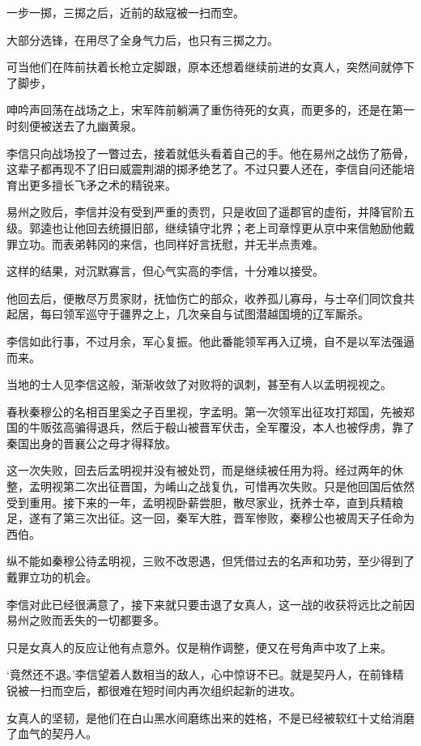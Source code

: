 一步一掷，三掷之后，近前的敌寇被一扫而空。

大部分选锋，在用尽了全身气力后，也只有三掷之力。

可当他们在阵前扶着长枪立定脚跟，原本还想着继续前进的女真人，突然间就停下了脚步，

呻吟声回荡在战场之上，宋军阵前躺满了重伤待死的女真，而更多的，还是在第一时刻便被送去了九幽黄泉。

李信只向战场投了一瞥过去，接着就低头看着自己的手。他在易州之战伤了筋骨，这辈子都再现不了旧曰威震荆湖的掷矛绝艺了。不过只要人还在，李信自问还能培育出更多擅长飞矛之术的精锐来。

易州之败后，李信并没有受到严重的责罚，只是收回了遥郡官的虚衔，并降官阶五级。郭逵也让他回去统摄旧部，继续镇守北界；老上司章惇更从京中来信勉励他戴罪立功。而表弟韩冈的来信，也同样好言抚慰，并无半点责难。

这样的结果，对沉默寡言，但心气实高的李信，十分难以接受。

他回去后，便散尽万贯家财，抚恤伤亡的部众，收养孤儿寡母，与士卒们同饮食共起居，每曰领军巡守于疆界之上，几次亲自与试图潜越国境的辽军厮杀。

李信如此行事，不过月余，军心复振。他此番能领军再入辽境，自不是以军法强逼而来。

当地的士人见李信这般，渐渐收敛了对败将的讽刺，甚至有人以孟明视视之。

春秋秦穆公的名相百里奚之子百里视，字孟明。第一次领军出征攻打郑国，先被郑国的牛贩弦高骗得退兵，然后于殽山被晋军伏击，全军覆没，本人也被俘虏，靠了秦国出身的晋襄公之母才得释放。

这一次失败，回去后孟明视并没有被处罚，而是继续被任用为将。经过两年的休整，孟明视第二次出征晋国，为崤山之战复仇，可惜再次失败。只是他回国后依然受到重用。接下来的一年，孟明视卧薪尝胆，散尽家业，抚养士卒，直到兵精粮足，遂有了第三次出征。这一回，秦军大胜，晋军惨败，秦穆公也被周天子任命为西伯。

纵不能如秦穆公待孟明视，三败不改恩遇，但凭借过去的名声和功劳，至少得到了戴罪立功的机会。

李信对此已经很满意了，接下来就只要击退了女真人，这一战的收获将远比之前因易州之败而丢失的一切都要多。

只是女真人的反应让他有点意外。仅是稍作调整，便又在号角声中攻了上来。

‘竟然还不退。’李信望着人数相当的敌人，心中惊讶不已。就是契丹人，在前锋精锐被一扫而空后，都很难在短时间内再次组织起新的进攻。

女真人的坚韧，是他们在白山黑水间磨练出来的姓格，不是已经被软红十丈给消磨了血气的契丹人。

